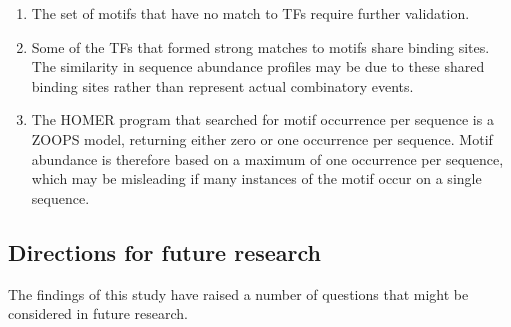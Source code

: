 \documentclass[12pt]{article}
\begin{document}
\begin{enumerate}
\item The set of motifs that have no match to TFs require further validation.
\item Some of the TFs that formed strong matches to motifs share binding sites. The similarity in sequence abundance profiles may be due to these shared binding sites rather than represent actual combinatory events.
\item The HOMER program that searched for motif occurrence per sequence is a ZOOPS model, returning either zero or one occurrence per sequence. Motif abundance is therefore based on a maximum of one occurrence per sequence, which may be misleading if many instances of the motif occur on a single sequence.
\end{enumerate}

\newpage
\subsection{Directions for future research}
The findings of this study have raised a number of questions that might be considered in future research. 
\end{document}
